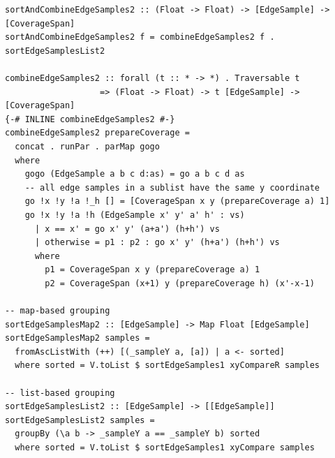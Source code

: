\documentclass[12pt, a4paper]{article}
\begin{document}
\begin{lstlisting}[label={lst:combinegroup}, caption={combineEdgeSamples with grouping}]
sortAndCombineEdgeSamples2 :: (Float -> Float) -> [EdgeSample] -> [CoverageSpan]
sortAndCombineEdgeSamples2 f = combineEdgeSamples2 f . sortEdgeSamplesList2

combineEdgeSamples2 :: forall (t :: * -> *) . Traversable t
                   => (Float -> Float) -> t [EdgeSample] -> [CoverageSpan]
{-# INLINE combineEdgeSamples2 #-}
combineEdgeSamples2 prepareCoverage =
  concat . runPar . parMap gogo
  where
    gogo (EdgeSample a b c d:as) = go a b c d as
    -- all edge samples in a sublist have the same y coordinate
    go !x !y !a !_h [] = [CoverageSpan x y (prepareCoverage a) 1]
    go !x !y !a !h (EdgeSample x' y' a' h' : vs)
      | x == x' = go x' y' (a+a') (h+h') vs
      | otherwise = p1 : p2 : go x' y' (h+a') (h+h') vs
      where
        p1 = CoverageSpan x y (prepareCoverage a) 1
        p2 = CoverageSpan (x+1) y (prepareCoverage h) (x'-x-1)

-- map-based grouping
sortEdgeSamplesMap2 :: [EdgeSample] -> Map Float [EdgeSample]
sortEdgeSamplesMap2 samples =
  fromAscListWith (++) [(_sampleY a, [a]) | a <- sorted]
  where sorted = V.toList $ sortEdgeSamples1 xyCompareR samples

-- list-based grouping
sortEdgeSamplesList2 :: [EdgeSample] -> [[EdgeSample]]
sortEdgeSamplesList2 samples =
  groupBy (\a b -> _sampleY a == _sampleY b) sorted
  where sorted = V.toList $ sortEdgeSamples1 xyCompare samples
\end{lstlisting}
\end{document}
